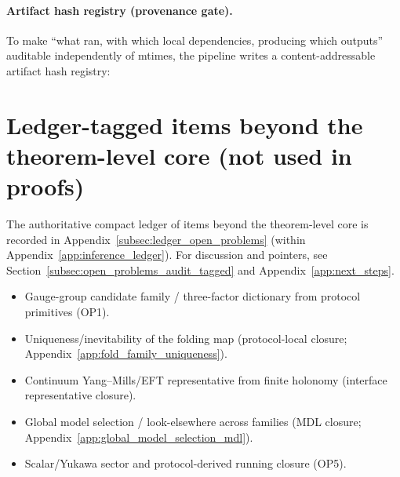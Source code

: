 \paragraph{Artifact hash registry (provenance gate).}
\AuditTag To make “what ran, with which local dependencies, producing which outputs” auditable independently of mtimes,
the pipeline writes a content-addressable artifact hash registry:




\section*{Ledger-tagged items beyond the theorem-level core (not used in proofs)}
\AuditTag The authoritative compact ledger of items beyond the theorem-level core is recorded in Appendix~\ref{subsec:ledger_open_problems} (within Appendix~\ref{app:inference_ledger}).
For discussion and pointers, see Section~\ref{subsec:open_problems_audit_tagged} and Appendix~\ref{app:next_steps}.
\begin{itemize}
  \item \AuditTag Gauge-group candidate family / three-factor dictionary from protocol primitives (OP1).
  \item \AuditTag Uniqueness/inevitability of the folding map (protocol-local closure; Appendix~\ref{app:fold_family_uniqueness}).
  \item \AuditTag Continuum Yang--Mills/EFT representative from finite holonomy (interface representative closure).
  \item \AuditTag Global model selection / look-elsewhere across families (MDL closure; Appendix~\ref{app:global_model_selection_mdl}).
  \item \AuditTag Scalar/Yukawa sector and protocol-derived running closure (OP5).
\end{itemize}

